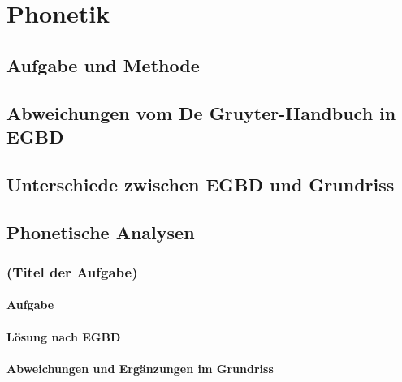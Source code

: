 \chapter{Phonetik}
\label{sec:phonetik}

\section{Aufgabe und Methode}
\label{sec:phonetik:aufgabeundmethoden}

\section{Abweichungen vom De Gruyter-Handbuch in EGBD}
\label{sec:phonetik:abweichungenvomdegruyterhandbuchinegbd}

\section{Unterschiede zwischen EGBD und Grundriss}
\label{sec:phonetik:unterschiedezwischenegbdundgrundriss}

\section{Phonetische Analysen}
\label{sec:phonetik:phonetischeanalysen}

\subsection{(Titel der Aufgabe)}

\subsubsection{Aufgabe}

\subsubsection{Lösung nach EGBD}

\subsubsection{Abweichungen und Ergänzungen im Grundriss}


